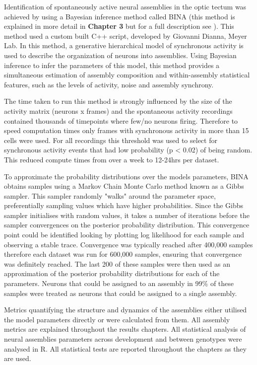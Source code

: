 Identification of spontaneously active neural assemblies in the optic tectum was achieved by using a Bayesian inference method called BINA (this method is explained in more detail in \textbf{Chapter 3} but for a full description see \cite{Diana2019BayesianAssemblies}). This method used a custom built C++ script, developed by Giovanni Dianna, Meyer Lab. In this method, a generative hierarchical model of synchronous activity is used to describe the organization of neurons into assemblies. Using Bayesian inference to infer the parameters of this model, this method provides a simultaneous estimation of assembly composition and within-assembly statistical features, such as the levels of activity, noise and assembly synchrony. 

The time taken to run this method is strongly influenced by the size of the activity matrix (neurons x frames) and the spontaneous activity recordings contained thousands of timepoints where few/no neurons firing. Therefore to speed computation times only frames with synchronous activity in more than 15 cells were used. For all recordings this threshold was used to select for synchronous activity events that had low probability (p < 0.02) of being random. This reduced compute times from over a week to 12-24hrs per dataset.

To approximate the probability distributions over the models parameters, BINA obtains samples using a Markov Chain Monte Carlo method known as a Gibbs sampler. This sampler randomly "walks" around the parameter space, preferentially sampling values which have higher probabilities. Since the Gibbs sampler initialises with random values, it takes a number of iterations before the sampler convergences on the posterior probability distribution. This convergence point could be identified looking by plotting log likelihood for each sample and observing a stable trace. Convergence was typically reached after 400,000 samples therefore each dataset was run for 600,000 samples, ensuring that convergence was definitely reached. The last 200 of these samples were then used as an approximation of the posterior probability distributions for each of the parameters. Neurons that could be assigned to an assembly in 99\% of these samples were treated as neurons that could be assigned to a single assembly. 

Metrics quantifying the structure and dynamics of the assemblies either utilised the model parameters directly or were calculated from them. All assembly metrics are explained throughout the results chapters. All statistical analysis of neural assemblies parameters across development and between genotypes were analysed in R. All statistical tests are reported throughout the chapters as they are used.

